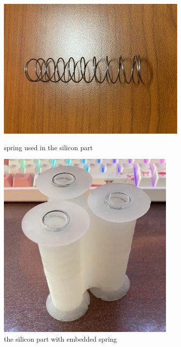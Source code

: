 \documentclass[twoside]{article}
\begin{document}
\begin{figure}[H]
	\centering

	\begin{minipage}[b]{0.3\textwidth}
		\centering
		\includegraphics[width=\textwidth]{spring}
		\caption{spring used in the silicon part}
	\end{minipage}
	\hspace*{2cm}
	\begin{minipage}[b]{0.3\textwidth}
		\centering
		\includegraphics[width=\textwidth]{silicon_with_spring}
		\caption{the silicon part with embedded spring}
	\end{minipage}

\end{figure}
\end{document}
